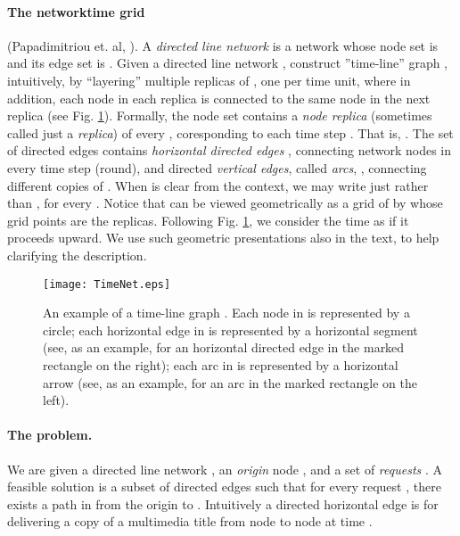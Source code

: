 \documentclass[11pt]{article}
\begin{document}
\paragraph*{\bf The networktime grid} (Papadimitriou et. al, \cite{papa3}).
A {\em directed line network }  is a network whose node set is  and its edge set is .
Given a directed line network , construct ''time-line'' graph , intuitively, by ``layering'' multiple replicas of ,
one per time unit, where in addition, each node in each replica is connected to the same node in
the next replica
(see Fig. \ref{figure:TimeNet}).
Formally, the node set  contains a {\em node replica}
(sometimes called just a {\em replica})  of every ,
coresponding to each time step .
That is, .
The set of directed edges  contains \emph{horizontal directed edges}
,
connecting network nodes in every time step (round),
and directed {\em vertical edges}, called {\em arcs},
,
connecting different copies of .
When  is clear from the context, we may write just  rather than , for every .
Notice that  can be viewed geometrically as a
grid of  by  whose grid points are the replicas.
Following Fig. \ref{figure:TimeNet}, we consider the time as if it proceeds upward.
We use such geometric presentations also in the text, to help clarifying the description.




\begin{figure}[ht]
\begin{center}
\texttt{[image: TimeNet.eps]}
\end{center}
\caption{\sf \label{figure:TimeNet}
An example of a time-line graph .
Each node in  is represented by a circle;
 each horizontal edge in  is represented by a horizontal segment (see, as an example,  for an horizontal directed edge in the marked  rectangle on the right);
each arc in  is represented by a horizontal arrow (see, as an example,
 for an arc in the marked  rectangle on the left).
}
\end{figure}




\paragraph*{\bf The  problem.}

We are given a directed line network , an \emph{origin} node  ,
and a set of \emph{requests} .
A feasible solution
is a subset of directed edges 
such that for every request , there exists a path in  from the origin  to .
Intuitively a directed horizontal edge  is for delivering a copy of a multimedia title from node  to node  at time .
\end{document}
